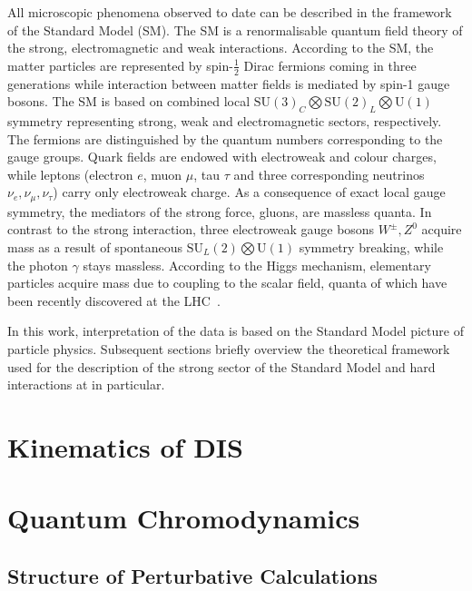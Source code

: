 All microscopic phenomena observed to date can be described in the framework of the Standard Model (SM). The SM is a renormalisable quantum field theory of the strong, electromagnetic and weak interactions. According to the SM, the matter particles are represented by spin-$\frac{1}{2}$ Dirac fermions coming in three generations while interaction between matter fields is mediated by spin-1 gauge bosons. The SM is based on combined local $\mathrm{SU}\left(3\right)_{C} \bigotimes \mathrm{SU}\left(2\right)_{L} \bigotimes \mathrm{U}\left(1\right)$ symmetry representing strong, weak and electromagnetic sectors, respectively. The fermions are distinguished by the quantum numbers corresponding to the gauge groups. Quark fields are endowed with electroweak and colour charges, while leptons (electron $e$, muon $\mu$, tau $\tau$ and three corresponding neutrinos $\nu_e, \nu_\mu, \nu_\tau$) carry only electroweak charge. As a consequence of exact local gauge symmetry, the mediators of the strong force, gluons, are massless quanta. In contrast to the strong interaction, three electroweak gauge bosons $W^\pm, Z^0$ acquire mass as a result of spontaneous $\mathrm{SU}_{L}\left(2\right) \bigotimes \mathrm{U}\left(1\right)$ symmetry breaking, while the photon $\gamma$ stays massless. According to the Higgs mechanism, elementary particles acquire mass due to coupling to the scalar field, quanta of which have been recently discovered at the LHC~\cite{pl:b716:1,pl:b716:30}.

In this work, interpretation of the data is based on the Standard Model picture of particle physics. Subsequent sections briefly overview the theoretical framework used for the description of the strong sector of the Standard Model and hard interactions at \hera in particular.

\section{Kinematics of DIS}
\label{sec:kindis}


\section{Quantum Chromodynamics}


\subsection{Structure of Perturbative Calculations}


